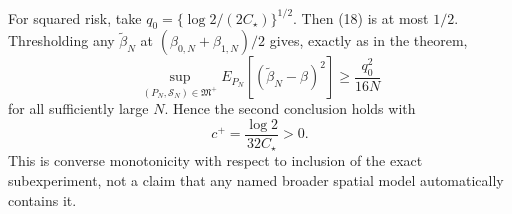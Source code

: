 For squared risk, take \(q_0=\{\log2/(2C_\star)\}^{1/2}\).  Then (18) is at most \(1/2\).  Thresholding any \(\widetilde\beta_N\) at \((\beta_{0,N}+\beta_{1,N})/2\) gives, exactly as in the theorem,
\[
 \sup_{(P_N,\mathcal S_N)\in\mathfrak M^+}
 E_{P_N}[(\widetilde\beta_N-\beta)^2]
 \geq\frac{q_0^2}{16N}
\]
for all sufficiently large \(N\).  Hence the second conclusion holds with
\[
 c^+=\frac{\log2}{32C_\star}>0.
\]
This is converse monotonicity with respect to inclusion of the exact subexperiment, not a claim that any named broader spatial model automatically contains it.
